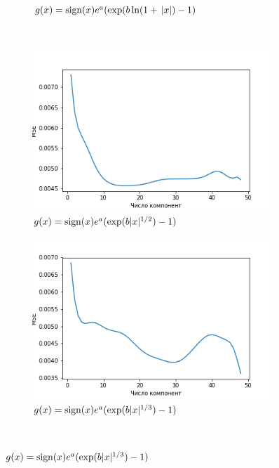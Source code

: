 \documentclass[12pt,fleqn,unicode]{article}
\begin{document}
\begin{figure}
\begin{subfigure}[b]{0.4\textwidth}
        \caption{$g(x) = \mathop{\rm sign}\limits(x)e^a(\exp(b\ln(1+ \,|x|) - 1)$}
        \label{fig:exp_log_x}
    \end{subfigure}
    ~ %
    \begin{subfigure}[b]{0.4\textwidth}
        \includegraphics[width=\textwidth]{exp_x_1_2.png}
        \caption{$g(x) = \mathop{\rm sign}\limits(x)e^a(\exp(b|x|^{1/2}) - 1)$}
        \label{fig:exp_x_1_2}
    \end{subfigure}
    \begin{subfigure}[b]{0.4\textwidth}
        \includegraphics[width=\textwidth]{exp_x_1_3.png}
        \caption{$g(x) = \mathop{\rm sign}\limits(x)e^a(\exp(b|x|^{1/3}) - 1)$ }
        \label{fig:exp_x_1_3}
    \end{subfigure}
    ~ %

\end{figure}
\end{document}
